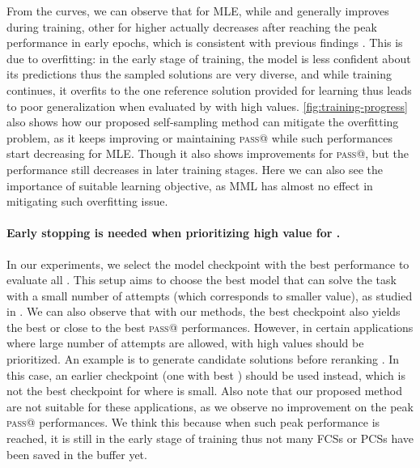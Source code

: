 From the curves, we can observe that for MLE, while  and  generally improves during training, other \patk for higher  actually decreases after reaching the peak performance in early epochs, which is consistent with previous findings \citep{cobbe2021training}. This is due to overfitting: in the early stage of training, the model is less confident about its predictions thus the sampled  solutions are very diverse, and while training continues, it overfits to the one reference solution provided for learning thus leads to poor generalization when evaluated by \patk with high  values. \autoref{fig:training-progress} also shows how our proposed self-sampling method can mitigate the overfitting problem, as it keeps improving or maintaining \textsc{pass}@ while such performances start decreasing for MLE. Though it also shows improvements for \textsc{pass}@, but the performance still decreases in later training stages. Here we can also see the importance of suitable learning objective, as MML has almost no effect in mitigating such overfitting issue.

\paragraph{Early stopping is needed when prioritizing high  value for \patk.}
In our experiments, we select the model checkpoint with the best  performance to evaluate all \patk. This setup aims to choose the best model that can solve the task with a small number of attempts (which corresponds to smaller  value), as studied in \citep{austin2021program}.
We can also observe that with our methods, the best  checkpoint also yields the best or close to the best \textsc{pass}@ performances.
However, in certain applications where large number of attempts are allowed, \patk with high  values should be prioritized. An example is to generate candidate solutions before reranking \citep{cobbe2021training}. In this case, an earlier checkpoint (\eg one with best ) should be used instead, which is not the best checkpoint for \patk where  is small. Also note that our proposed method are not suitable for these applications, as we observe no improvement on the peak \textsc{pass}@ performances. We think this because when such peak performance is reached, it is still in the early stage of training thus not many FCSs or PCSs have been saved in the buffer yet.

